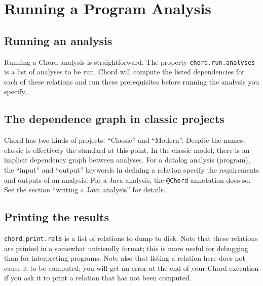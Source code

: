 \section{Running a Program Analysis}
\label{sec:running-analysis}

\subsection{Running an analysis}
Running a Chord analysis is straightforward.
The property  \texttt{chord.run.analyses} is a list of analyses to be run. Chord will compute the listed dependencies for each of these relations and run these prerequisites before running the analysis you specify.

\subsection{The dependence graph in classic projects}

Chord has two kinds of projects: ``Classic'' and ``Modern''.  Despite the names, classic is effectively the standard at this point.
In the classic model, there is an implicit dependency graph between analyses. For a datalog analysis (program), the ``input'' and ``output'' keywords in defining a relation specify the requirements and outputs of an analysis.  For a Java analysis, the \texttt{@Chord} annotation does so. See the section ``writing a Java analysis'' for details.

\subsection{Printing the results}

\texttt{chord.print.rels} is a list of relations to dump to disk. Note that these relations are printed in a somewhat unfriendly format; this is more useful for debugging than for interpreting programs. Note also that listing a relation here does not cause it to be computed; you will get an error at the end of your Chord execution if you ask it to print a relation that has not been computed.


